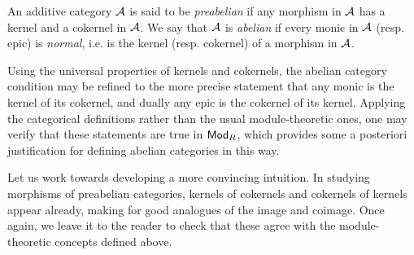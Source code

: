 \begin{definition}
  An additive category $\abcat{A}$ is said to be \emph{preabelian} if
  any morphism in $\abcat{A}$ has a kernel and a cokernel in $\abcat{A}$.
  We say that $\abcat{A}$ is \emph{abelian} if every monic in
  $\abcat{A}$ (resp. epic) is \emph{normal}, i.e. is the kernel
  (resp. cokernel) of a morphism in $\abcat{A}$.
\end{definition}

Using the universal properties of kernels and cokernels, the abelian
category condition may be refined to the more precise statement that
any monic is the kernel of its cokernel, and dually any epic is the
cokernel of its kernel.
Applying the categorical definitions rather than the usual
module-theoretic ones, one may verify that these statements are true
in ${\mathsf{Mod}}_{{R}}$, which provides some a posteriori justification for
defining abelian categories in this way.

\iffalse
We can refine (AB2) to a more precise statement.
Given a monic $m$ in $\abcat{A}$, we have $m = \ker(f)$ for some morphism $f$.
Since $f m = 0$, $f$ factors through $\coker(m)$ by the universal
property of cokernels.
By definition $\coker(m) \circ m = 0$, and for any other morphism
$g$ satisfying $\coker(m) \circ g = 0$ it follows that $fg = 0$,
so $g$ factors through $m$ by the universal property of kernels.
This shows that in fact $m = \ker(\coker(m))$, and by duality $e =
\coker(\ker(e))$ for any epic $e$ in $\abcat{A}$.
\fi

\iffalse
Given a monic $k: K \to A$ in $\abcat{A}$, let $(C, c)$ be a
cokernel of $k$ and suppose that $(K, k)$ is a kernel of the
morphism $f: A \to B$.
Then $fk = 0$ by construction, so $f$ factors through a unique
morphism $f': C \to B$ by the universal property of $(C, c)$.
We also have by construction that $ck = 0$, and for any other
morphism $g: D \to A$ satisfying $cg = 0$ it follows that $fg =
f'cg = 0$, so $g$ factors through a unique morphism $g': D \to K$
by the universal property of $(K, k)$.
Thus $(K, k)$ is also a kernel of $(C, c)$, i.e. any monic in
$\abcat{A}$ is a kernel of its cokernel.
This argument dualises to show also that any epic in $\abcat{A}$ is
a cokernel of its kernel.

As similar kernels and cokernels appear in relation to any morphism
in a (pre)abelian category, we give them familiar names.
\fi

Let us work towards developing a more convincing intuition.
In studying morphisms of preabelian categories, kernels of cokernels
and cokernels of kernels appear already, making for good analogues of
the image and coimage.
Once again, we leave it to the reader to check that these agree with
the module-theoretic concepts defined above.

